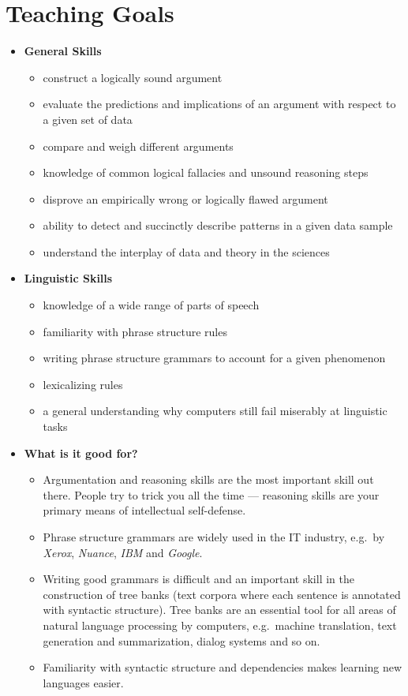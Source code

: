 \section{Teaching Goals}
\begin{itemize}
    \item \textbf{General Skills}
        \begin{itemize}
            \item construct a logically sound argument
            \item evaluate the predictions and implications of an argument with respect to a given set of data
            \item compare and weigh different arguments
            \item knowledge of common logical fallacies and unsound reasoning steps
            \item disprove an empirically wrong or logically flawed argument 
            \item ability to detect and succinctly describe patterns in a given data sample
            \item understand the interplay of data and theory in the sciences
        \end{itemize}
    \item \textbf{Linguistic Skills}
        \begin{itemize}
            \item knowledge of a wide range of parts of speech
            \item familiarity with phrase structure rules
            \item writing phrase structure grammars to account for a given phenomenon
            \item lexicalizing rules
            \item a general understanding why computers still fail miserably at linguistic tasks
        \end{itemize}
    \item \textbf{What is it good for?}
        \begin{itemize}
            \item Argumentation and reasoning skills are the most important skill out there.
                People try to trick you all the time --- reasoning skills are your primary means of intellectual self-defense.
            \item Phrase structure grammars are widely used in the IT industry, e.g.\ by \emph{Xerox}, \emph{Nuance}, \emph{IBM} and \emph{Google}.
            \item Writing good grammars is difficult and an important skill in the construction of tree banks (text corpora where each sentence is annotated with syntactic structure). Tree banks are an essential tool for all areas of natural language processing by computers, e.g.\ machine translation, text generation and summarization, dialog systems and so on.
            \item Familiarity with syntactic structure and dependencies makes learning new languages easier.
        \end{itemize}
\end{itemize}



